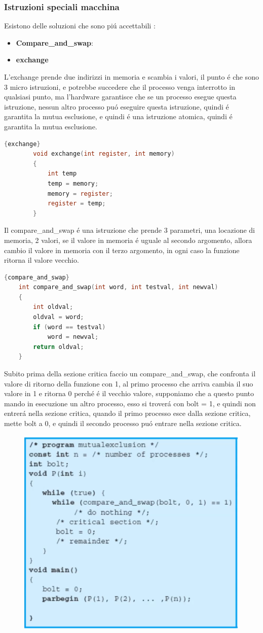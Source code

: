 \subsubsection*{Istruzioni speciali macchina}
Esistono delle soluzioni che sono piú accettabili :
\begin{itemize}
    \item \textbf{Compare\_and\_swap}:
    \item \textbf{exchange}
\end{itemize}
L'exchange prende due indirizzi in memoria e scambia i valori, il punto é che sono 3 micro istruzioni, e potrebbe succedere che il processo venga interrotto in qualsiasi punto, ma l'hardware garantisce che se
un processo esegue questa istruzione, nessun altro processo puó eseguire questa istruzione, quindi é garantita la mutua esclusione, e quindi é una istruzione
atomica, quindi é garantita la mutua esclusione.
    \begin{lstlisting}[language=C]{exchange}
        void exchange(int register, int memory)
        {
            int temp
            temp = memory;
            memory = register;
            register = temp;
        }
    \end{lstlisting}
Il compare\_and\_swap é una istruzione che prende 3 parametri, una locazione di memoria, 2 valori, se il valore in memoria é uguale al secondo argomento, allora cambio il valore in memoria con il terzo argomento, in
ogni caso la funzione ritorna il valore vecchio.
\begin{lstlisting}[language=C]{compare_and_swap}
    int compare_and_swap(int word, int testval, int newval)
    {
        int oldval;
        oldval = word;
        if (word == testval)
            word = newval;
        return oldval;
    }
\end{lstlisting}
Subito prima della sezione critica faccio un compare\_and\_swap, che confronta il valore di ritorno della funzione con 1,
al primo processo che arriva cambia il suo valore in 1 e ritorna 0 perché é il vecchio valore, supponiamo che
a questo punto mando in esecuzione un altro processo, esso si troverá con bolt = 1, e quindi non entrerá nella sezione critica, quando il primo processo
esce dalla sezione critica, mette bolt a 0, e quindi il secondo processo puó entrare nella sezione critica.
\begin{figure}[H]
    \centering
    \includegraphics[width=0.7\linewidth]{immagini/CompareAndSwap}
\end{figure}
